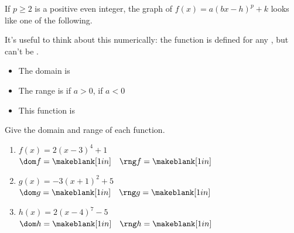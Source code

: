 \begin{fact}
If $p\geq 2$ is a positive even integer, the graph of $f(x)=a(bx-h)^p+k$ looks like one of the following.
\begin{center}
\end{center}
It's useful to think about this numerically: the function is defined for any \makeblank[0.75in], but \makeblank[1in] can't be \makeblank[1in].
\begin{itemize}
\item The domain is \makeblank
\item The range is \makeblank[1.5in] if $a>0$, \makeblank[1.5in] if $a<0$
\item This function is \makeblank
\end{itemize}
\end{fact}
\begin{Example}
Give the domain and range of each function.
\begin{enumerate}\setabc
\item $f(x)=2(x-3)^4+1$\hfill$\dom f=\makeblank[1in]\quad\rng f=\makeblank[1in]$
\item $g(x)=-3(x+1)^2+5$\hfill$\dom g=\makeblank[1in]\quad\rng g=\makeblank[1in]$
\item $h(x)=2(x-4)^7-5$\hfill$\dom h=\makeblank[1in]\quad\rng h=\makeblank[1in]$
\end{enumerate}
\end{Example}